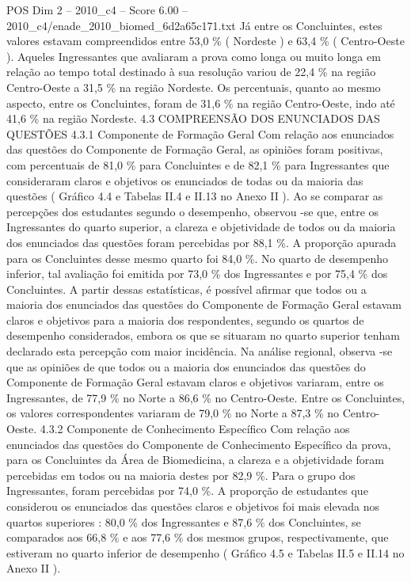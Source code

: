\begin{textsample}{POS Dim 2 – 2010\_c4 – Score 6.00 – 2010\_c4/enade\_2010\_biomed\_6d2a65c171.txt}
Já entre os Concluintes, estes valores estavam compreendidos entre 53,0 \% ( Nordeste ) e 63,4 \% ( Centro-Oeste ).
Aqueles Ingressantes que avaliaram a prova como longa ou muito longa em relação ao tempo total destinado à sua resolução variou de 22,4 \% na região Centro-Oeste a 31,5 \% na região Nordeste.
Os percentuais, quanto ao mesmo aspecto, entre os Concluintes, foram de 31,6 \% na região Centro-Oeste, indo até 41,6 \% na região Nordeste. 4.3 COMPREENSÃO DOS ENUNCIADOS DAS QUESTÕES 4.3.1 Componente de Formação Geral Com relação aos enunciados das questões do Componente de Formação Geral, as opiniões foram positivas, com percentuais de 81,0 \% para Concluintes e de 82,1 \% para Ingressantes que consideraram claros e objetivos os enunciados de todas ou da maioria das questões ( Gráfico 4.4 e Tabelas II.4 e II.13 no Anexo II ).
Ao se comparar as percepções dos estudantes segundo o desempenho, observou -se que, entre os Ingressantes do quarto superior, a clareza e objetividade de todos ou da maioria dos enunciados das questões foram percebidas por 88,1 \%.
A proporção apurada para os Concluintes desse mesmo quarto foi 84,0 \%.
No quarto de desempenho inferior, tal avaliação foi emitida por 73,0 \% dos Ingressantes e por 75,4 \% dos Concluintes.
A partir dessas estatísticas, é possível afirmar que todos ou a maioria dos enunciados das questões do Componente de Formação Geral estavam claros e objetivos para a maioria dos respondentes, segundo os quartos de desempenho considerados, embora os que se situaram no quarto superior tenham declarado esta percepção com maior incidência.
Na análise regional, observa -se que as opiniões de que todos ou a maioria dos enunciados das questões do Componente de Formação Geral estavam claros e objetivos variaram, entre os Ingressantes, de 77,9 \% no Norte a 86,6 \% no Centro-Oeste.
Entre os Concluintes, os valores correspondentes variaram de 79,0 \% no Norte a 87,3 \% no Centro-Oeste. 4.3.2 Componente de Conhecimento Específico Com relação aos enunciados das questões do Componente de Conhecimento Específico da prova, para os Concluintes da Área de Biomedicina, a clareza e a objetividade foram percebidas em todos ou na maioria destes por 82,9 \%.
Para o grupo dos Ingressantes, foram percebidas por 74,0 \%.
A proporção de estudantes que considerou os enunciados das questões claros e objetivos foi mais elevada nos quartos superiores : 80,0 \% dos Ingressantes e 87,6 \% dos Concluintes, se comparados aos 66,8 \% e aos 77,6 \% dos mesmos grupos, respectivamente, que estiveram no quarto inferior de desempenho ( Gráfico 4.5 e Tabelas II.5 e II.14 no Anexo II ).

\end{textsample}
